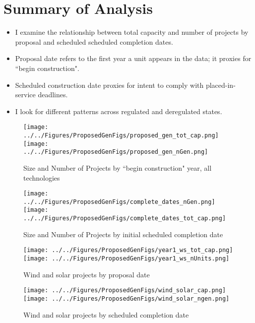 \documentclass[12pt, oneside]{article}   	%
\begin{document}
\section{Summary of Analysis}
\singlespacing
\begin{itemize}
\item I examine the relationship between total capacity and number of projects by proposal and scheduled scheduled completion dates.
\item Proposal date refers to the first year a unit appears in the data; it proxies for ``begin construction".
\item Scheduled construction date proxies for intent to comply with placed-in-service deadlines.
\item I look for different patterns across regulated and deregulated states. 
\end{itemize}

\newpage
\begin{figure}[!hb]
\caption{Size and Number of Projects by ``begin construction" year, all technologies}
\texttt{[image: ../../Figures/ProposedGenFigs/proposed\_gen\_tot\_cap.png]}\\
\texttt{[image: ../../Figures/ProposedGenFigs/proposed\_gen\_nGen.png]}
\end{figure}

\begin{figure}[!hb]
\caption{Size and Number of Projects by initial scheduled completion date}
\texttt{[image: ../../Figures/ProposedGenFigs/complete\_dates\_nGen.png]}
\texttt{[image: ../../Figures/ProposedGenFigs/complete\_dates\_tot\_cap.png]}
\end{figure}

\begin{figure}[!hb]
\caption{Wind and solar projects by proposal date}
\texttt{[image: ../../Figures/ProposedGenFigs/year1\_ws\_tot\_cap.png]}
\texttt{[image: ../../Figures/ProposedGenFigs/year1\_ws\_nUnits.png]}
\end{figure}

\begin{figure}[!hb]
\caption{Wind and solar projects by scheduled completion date}
\texttt{[image: ../../Figures/ProposedGenFigs/wind\_solar\_cap.png]}
\texttt{[image: ../../Figures/ProposedGenFigs/wind\_solar\_ngen.png]}
\end{figure}
\end{document}
